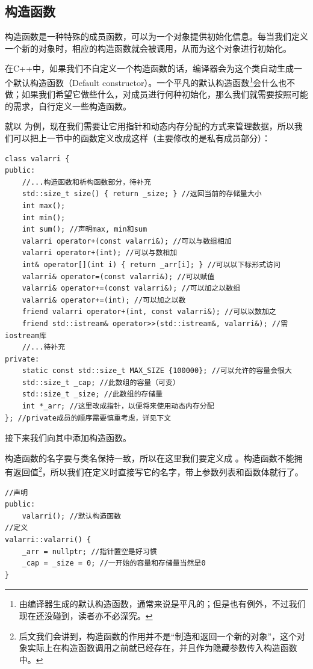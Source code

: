 \subsection*{构造函数}
构造函数是一种特殊的成员函数，可以为一个对象提供初始化信息。每当我们定义一个新的对象时，相应的构造函数就会被调用，从而为这个对象进行初始化。\par
在C++中，如果我们不自定义一个构造函数的话，编译器会为这个类自动生成一个默认构造函数（Default constructor）。一个平凡的默认构造函数\footnote{由编译器生成的默认构造函数，通常来说是平凡的；但是也有例外，不过我们现在还没碰到，读者亦不必深究。}会什么也不做；如果我们希望它做些什么，对成员进行何种初始化，那么我们就需要按照可能的需求，自行定义一些构造函数。\par
就以 \lstinline@valarray@ 为例，现在我们需要让它用指针和动态内存分配的方式来管理数据，所以我们可以把上一节中的函数定义改成这样（主要修改的是私有成员部分）：
\begin{lstlisting}
class valarri {
public:
    //...构造函数和析构函数部分，待补充
    std::size_t size() { return _size; } //返回当前的存储量大小
    int max();
    int min();
    int sum(); //声明max, min和sum
    valarri operator+(const valarri&); //可以与数组相加
    valarri operator+(int); //可以与数相加
    int& operator[](int i) { return _arr[i]; } //可以以下标形式访问
    valarri& operator=(const valarri&); //可以赋值
    valarri& operator+=(const valarri&); //可以加之以数组
    valarri& operator+=(int); //可以加之以数
    friend valarri operator+(int, const valarri&); //可以以数加之
    friend std::istream& operator>>(std::istream&, valarri&); //需iostream库
    //...待补充
private:
    static const std::size_t MAX_SIZE {100000}; //可以允许的容量会很大
    std::size_t _cap; //此数组的容量（可变）
    std::size_t _size; //此数组的存储量
    int *_arr; //这里改成指针，以便将来使用动态内存分配
}; //private成员的顺序需要慎重考虑，详见下文
\end{lstlisting}
接下来我们向其中添加构造函数。\par
构造函数的名字要与类名保持一致，所以在这里我们要定义成 \lstinline@valarri@。构造函数不能拥有返回值\footnote{后文我们会讲到，构造函数的作用并不是``制造和返回一个新的对象''，这个对象实际上在构造函数调用之前就已经存在，并且作为隐藏参数传入构造函数中。}，所以我们在定义时直接写它的名字，带上参数列表和函数体就行了。
\begin{lstlisting}
//声明
public:
    valarri(); //默认构造函数
//定义
valarri::valarri() {
    _arr = nullptr; //指针置空是好习惯
    _cap = _size = 0; //一开始的容量和存储量当然是0
}
\end{lstlisting}
